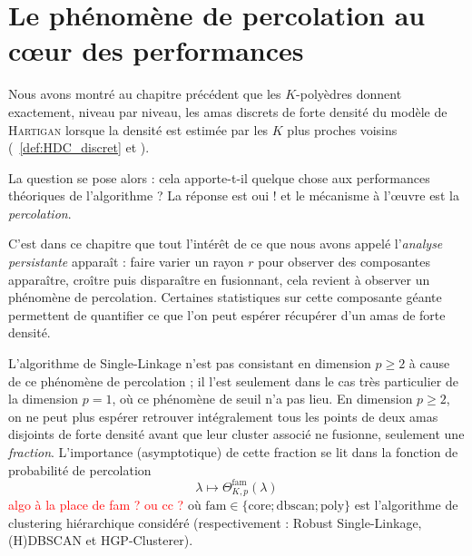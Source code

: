 \chapter{Le phénomène de percolation au c\oe{}ur des performances}
\label{sec:chap_percolation}

Nous avons montré au chapitre précédent que les $K$-polyèdres donnent exactement, niveau par niveau, les amas discrets de forte densité du modèle de \textsc{Hartigan} lorsque la densité est estimée par les $K$ plus proches voisins (\Def~\ref{def:HDC_discret} et ). 

La question se pose alors : cela apporte-t-il quelque chose aux performances théoriques de l'algorithme ?
La réponse est oui ! et le mécanisme à l'œuvre est la \emph{percolation}. 

C'est dans ce chapitre que tout l'intérêt de ce que nous avons appelé l'\emph{analyse persistante} apparaît : faire varier un rayon $r$ pour observer des composantes apparaître, croître puis disparaître en fusionnant, cela revient à observer un phénomène de percolation. Certaines statistiques sur cette composante géante permettent de quantifier ce que l'on peut espérer récupérer d'un amas de forte densité.

L'algorithme de Single-Linkage n'est pas consistant en dimension $p \ge 2$ à cause de ce phénomène de percolation ; il l'est seulement dans le cas très particulier de la dimension $p=1$, où ce phénomène de seuil n'a pas lieu. En dimension $p \ge 2$, on ne peut plus espérer retrouver intégralement tous les points de deux amas disjoints de forte densité avant que leur cluster associé ne fusionne, seulement une \emph{fraction}. L'importance (asymptotique) de cette fraction se lit dans la fonction de probabilité de percolation
\[
    \lambda\longmapsto \Theta^{\mathrm{fam}}_{K,p}(\lambda)
\]
\textcolor{red}{algo à la place de fam ? ou cc ?}
où $\mathrm{fam} \in \bigl\{ \mathrm{core} ; \mathrm{dbscan} ; \mathrm{poly}\bigr\}$ est l'algorithme de clustering hiérarchique considéré (respectivement : Robust Single-Linkage, (H)DBSCAN et HGP-Clusterer).

